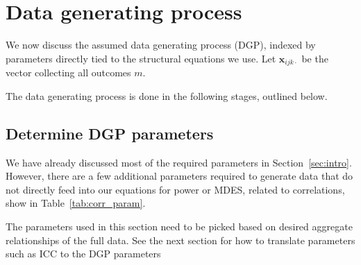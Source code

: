 \documentclass[12pt]{article}
\begin{document}

\newpage
\section{Data generating process}

We now discuss the assumed data generating process (DGP), indexed by parameters directly tied to the structural equations we use.
Let $\boldsymbol{x}_{ijk\cdot}$ be the vector collecting all outcomes $m$.

The data generating process is done in the following stages, outlined below.

\subsection{Determine DGP parameters}
\label{sec:dgp_param}

We have already discussed most of the required parameters in Section~\ref{sec:intro}.
However, there are a few additional parameters required to generate data that do not directly feed into our equations for power or MDES, related to correlations, show in Table~\ref{tab:corr_param}.

The parameters used in this section need to be picked based on desired aggregate relationships of the full data.
See the next section for how to translate parameters such as ICC to the DGP parameters
\end{document}
